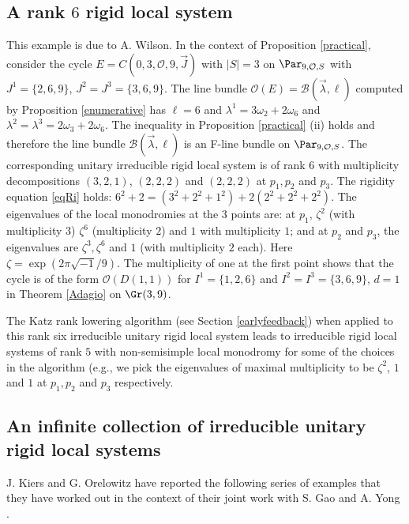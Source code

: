 \subsection{A rank $6$ rigid local system}\label{wilson}
This example is due to A. Wilson. In the context of Proposition  \ref{practical}, consider the cycle $E=C(0,3,\mathcal{O},9,\vec{J})$ with $|S|=3$ on $\Par_{9,\mathcal{O},S}$ with
$J^1=\{2,6,9\}$, $J^2=J^3=\{3,6,9\}$. The line bundle $\mathcal{O}(E)=\mathcal{B}(\vec{\lambda},\ell)$ computed by Proposition  \ref{enumerative} has $\ell=6$ and $\lambda^1= 3\omega_2+2\omega_6$ and $\lambda^2=\lambda^3=2\omega_3+ 2\omega_6$. The inequality in Proposition  \ref{practical} (ii) holds and therefore the line bundle $\mathcal{B}(\vec{\lambda},\ell)$ is an F-line bundle on $\Par_{9,\mathcal{O},S}$. The corresponding unitary irreducible rigid local system is of rank $6$ with multiplicity decompositions $(3,2,1)$, $(2,2,2)$ and $(2,2,2)$ at $p_1,p_2$ and $p_3$. The rigidity equation \eqref{eqRi} holds:
$6^2+2=(3^2+2^2+1^2) + 2(2^2+2^2+2^2)$. The eigenvalues of the local monodromies at the 3 points are: at $p_1$, $\zeta^2$ (with multiplicity $3$) $\zeta^6$ (multiplicity $2$) and $1$ with multiplicity $1$; and at $p_2$ and $p_3$, the eigenvalues are $\zeta^3,\zeta^6$ and $1$ (with multiplicity $2$ each). Here $\zeta=\exp(2\pi\sqrt{-1}/9)$. The multiplicity of one at the first point shows that the cycle is of the form $\mathcal{O}(D(1,1))$ for $I^1=\{1,2,6\}$ and $I^2=I^3=\{3,6,9\}$, $d=1$ in Theorem \ref{Adagio} on $\Gr(3,9)$.

The Katz rank lowering algorithm (see Section \ref{earlyfeedback}) when applied to this rank six irreducible unitary rigid local system leads to irreducible rigid local systems of rank $5$ with non-semisimple local monodromy for some  of the choices in the algorithm (e.g., we pick the eigenvalues of maximal multiplicity to be $\zeta^2$, $1$ and $1$ at $p_1,p_2$ and $p_3$ respectively.

\subsection{An infinite collection of irreducible  unitary rigid local systems}\label{KO}
J. Kiers and G. Orelowitz have reported the following series of examples that they have worked out in the context of  their joint work with S. Gao and A. Yong \cite{Kiers_etal}.


